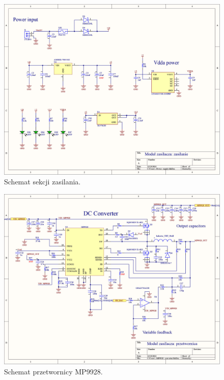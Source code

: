 \begin{figure}
    \begin{center}
        \includegraphics[width = 21cm]{zalaczniki/zasilacz/Zasilacz_regulowany_Strona_03.jpg}
        \caption{Schemat sekcji zasilania.}
    \end{center}
\end{figure}

\begin{figure}
    \begin{center}
        \includegraphics[width = 21cm]{zalaczniki/zasilacz/Zasilacz_regulowany_Strona_04.jpg}
        \caption{Schemat przetwornicy MP9928.}
    \end{center}
\end{figure}

